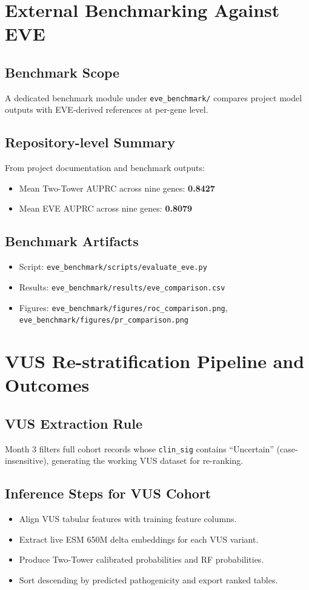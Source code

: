 \documentclass[11pt,a4paper]{article}
\begin{document}
\section{External Benchmarking Against EVE}
\subsection{Benchmark Scope}
A dedicated benchmark module under \texttt{eve\_benchmark/} compares project model outputs with EVE-derived references at per-gene level.

\subsection{Repository-level Summary}
From project documentation and benchmark outputs:
\begin{itemize}[leftmargin=1.2cm]
    \item Mean Two-Tower AUPRC across nine genes: \textbf{0.8427}
    \item Mean EVE AUPRC across nine genes: \textbf{0.8079}
\end{itemize}

\subsection{Benchmark Artifacts}
\begin{itemize}[leftmargin=1.2cm]
    \item Script: \texttt{eve\_benchmark/scripts/evaluate\_eve.py}
    \item Results: \texttt{eve\_benchmark/results/eve\_comparison.csv}
    \item Figures: \texttt{eve\_benchmark/figures/roc\_comparison.png}, \texttt{eve\_benchmark/figures/pr\_comparison.png}
\end{itemize}

\section{VUS Re-stratification Pipeline and Outcomes}
\subsection{VUS Extraction Rule}
Month 3 filters full cohort records whose \texttt{clin\_sig} contains ``Uncertain'' (case-insensitive), generating the working VUS dataset for re-ranking.

\subsection{Inference Steps for VUS Cohort}
\begin{itemize}[leftmargin=1.2cm]
    \item Align VUS tabular features with training feature columns.
    \item Extract live ESM 650M delta embeddings for each VUS variant.
    \item Produce Two-Tower calibrated probabilities and RF probabilities.
    \item Sort descending by predicted pathogenicity and export ranked tables.
\end{itemize}
\end{document}
